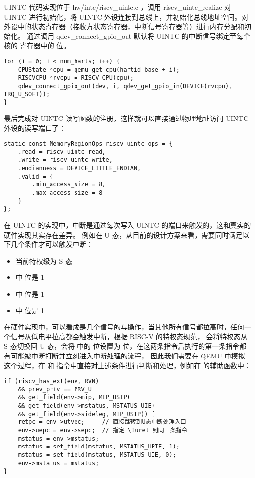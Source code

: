 UINTC 代码实现位于 hw/intc/riscv\_uintc.c ，调用 riscv\_uintc\_realize 对 UINTC 进行初始化，将 UINTC 外设连接到总线上，并初始化总线地址空间。对外设中的状态寄存器（接收方状态寄存器，中断信号寄存器等）进行内存分配和初始化。
通过调用 qdev\_connect\_gpio\_out 默认将 UINTC 的中断信号绑定至每个核的 \Ruip 寄存器中的 \FcsrUipUsip 位。

\begin{lstlisting}[style=CStyle]
for (i = 0; i < num_harts; i++) {
    CPUState *cpu = qemu_get_cpu(hartid_base + i);
    RISCVCPU *rvcpu = RISCV_CPU(cpu);
    qdev_connect_gpio_out(dev, i, qdev_get_gpio_in(DEVICE(rvcpu), IRQ_U_SOFT));
}
\end{lstlisting}

最后完成对 UINTC 读写函数的注册，这样就可以直接通过物理地址访问 UINTC 外设的读写端口了：

\begin{lstlisting}[style=CStyle]
static const MemoryRegionOps riscv_uintc_ops = {
    .read = riscv_uintc_read,
    .write = riscv_uintc_write,
    .endianness = DEVICE_LITTLE_ENDIAN,
    .valid = {
        .min_access_size = 8,
        .max_access_size = 8
    }
};
\end{lstlisting}

在 UINTC 的实现中，中断是通过每次写入 UINTC 的端口来触发的，这和真实的硬件实现其实存在差异。
例如在 U 态，从目前的设计方案来看，需要同时满足以下几个条件才可以触发中断：

\begin{itemize}
    \item 当前特权级为 S 态
    \item \Rustatus 中 \FcsrUstatusUie 位是 1
    \item \Ruie 中 \FcsrUieUsie 位是 1
    \item \Ruip 中 \FcsrUipUsip 位是 1
\end{itemize}

在硬件实现中，可以看成是几个信号的与操作，当其他所有信号都拉高时，任何一个信号从低电平拉高都会触发中断，根据 RISC-V 的特权态规范\cite{rvpriv110}，
\Isret 会将特权态从 S 态切换回 U 态，\Iuret 会将 \Rustatus 中的 \FcsrUstatusUie 位设置为 \FcsrUstatusUpie 位，在这两条指令后执行的第一条指令都有可能被中断打断并立刻进入中断处理的流程，
因此我们需要在 QEMU 中模拟这个过程，在 \Isret 和 \Iuret 指令中直接对上述条件进行判断和处理，例如在 \Isret 的辅助函数中：

\lstset{language=C}
\begin{lstlisting}[style=CStyle]
if (riscv_has_ext(env, RVN)
    && prev_priv == PRV_U
    && get_field(env->mip, MIP_USIP)
    && get_field(env->mstatus, MSTATUS_UIE)
    && get_field(env->sideleg, MIP_USIP)) {
    retpc = env->utvec;     // 直接跳转到U态中断处理入口
    env->uepc = env->sepc;  // 指定 \Iuret 到同一条指令
    mstatus = env->mstatus;
    mstatus = set_field(mstatus, MSTATUS_UPIE, 1);
    mstatus = set_field(mstatus, MSTATUS_UIE, 0);
    env->mstatus = mstatus;
}
\end{lstlisting}
